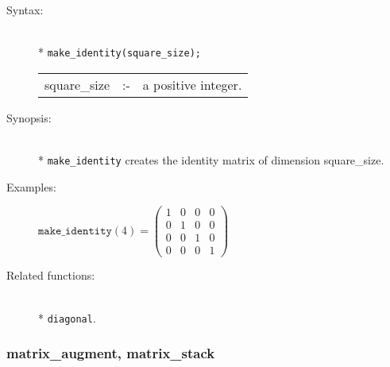 \begin{description}
\item[Syntax:]\mbox{}\\*
\texttt{make\_identity(square\_size);}\\[2mm]
\begin{tabular}{l l l}
square\_size &:-& a positive integer.
\end{tabular}

\item[Synopsis:]\mbox{}\\*
\texttt{make\_identity} creates the identity matrix of
                dimension square\_size.

\item[Examples:]
\begin{flushleft}
\(
\texttt{make\_identity}(4)  =
        \begin{pmatrix} 1 & 0 & 0 & 0 \\ 0 & 1 & 0 & 0 \\
                        0 & 0 & 1 & 0 \\ 0 & 0 & 0 & 1
 \end{pmatrix}
\)
\end{flushleft}

\item[Related functions:]\mbox{}\\*
\texttt{diagonal}.
\end{description}


\subsubsection{matrix\_augment, matrix\_stack}
\label{linalg:matrix_augment}

